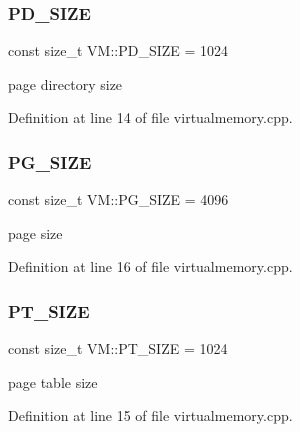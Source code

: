 \subsubsection{\texorpdfstring{P\+D\+\_\+\+S\+I\+ZE}{PD\_SIZE}}
{\footnotesize\ttfamily const size\+\_\+t V\+M\+::\+P\+D\+\_\+\+S\+I\+ZE = 1024}



page directory size 



Definition at line 14 of file virtualmemory.\+cpp.

\mbox{\label{namespace_v_m_a3afc454e973b965743e84ed10d74161c}} 
\subsubsection{\texorpdfstring{P\+G\+\_\+\+S\+I\+ZE}{PG\_SIZE}}
{\footnotesize\ttfamily const size\+\_\+t V\+M\+::\+P\+G\+\_\+\+S\+I\+ZE = 4096}



page size 



Definition at line 16 of file virtualmemory.\+cpp.

\mbox{\label{namespace_v_m_a64558f9565f1bb4a12eb2ddd7b7c1106}} 
\subsubsection{\texorpdfstring{P\+T\+\_\+\+S\+I\+ZE}{PT\_SIZE}}
{\footnotesize\ttfamily const size\+\_\+t V\+M\+::\+P\+T\+\_\+\+S\+I\+ZE = 1024}



page table size 



Definition at line 15 of file virtualmemory.\+cpp.

